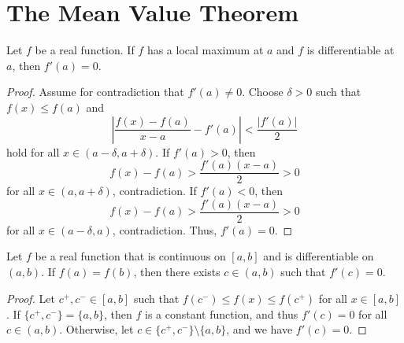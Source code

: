 \section{The Mean Value Theorem}
\begin{theorem}
  Let $f$ be a real function.
  If $f$ has a local maximum at $a$ and $f$ is differentiable at $a$,
  then $f'(a) = 0$.
\end{theorem}
\begin{proof}
  Assume for contradiction that $f'(a) \neq 0$.
  Choose $\delta > 0$ such that $f(x) \leq f(a)$ and
  \begin{equation*}
    \left|\frac{f(x) - f(a)}{x - a} - f'(a)\right| < \frac{|f'(a)|}{2}
  \end{equation*}
  hold for all $x \in (a - \delta, a + \delta)$.
  If $f'(a) > 0$, then
  \begin{equation*}
    f(x) - f(a) > \frac{f'(a)(x - a)}{2} > 0
  \end{equation*}
  for all $x \in (a, a + \delta)$, contradiction.
  If $f'(a) < 0$, then
  \begin{equation*}
    f(x) - f(a) > \frac{f'(a)(x - a)}{2} > 0
  \end{equation*}
  for all $x \in (a - \delta, a)$, contradiction.
  Thus, $f'(a) = 0$.
\end{proof}

\begin{theorem}
  Let $f$ be a real function that is continuous on $[a, b]$ and is
  differentiable on $(a, b)$.
  If $f(a) = f(b)$, then there exists $c \in (a, b)$ such that $f'(c) = 0$.
\end{theorem}
\begin{proof}
  Let $c^+, c^- \in [a, b]$ such that $f(c^-) \leq f(x) \leq f(c^+)$ for all
  $x \in [a, b]$.
  If $\{c^+, c^-\} = \{a, b\}$, then $f$ is a constant function, and thus
  $f'(c) = 0$ for all $c \in (a, b)$.
  Otherwise, let $c \in \{c^+, c^-\} \setminus \{a, b\}$, and we have
  $f'(c) = 0$.
\end{proof}

